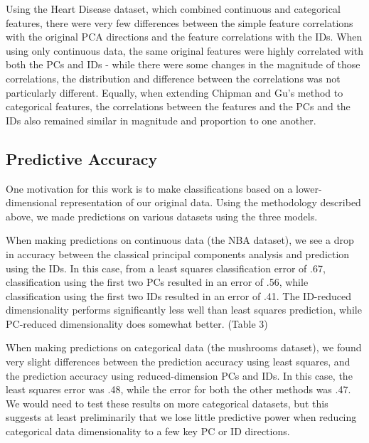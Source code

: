 \documentclass{article}
\begin{document}
{{Using the Heart Disease dataset, which combined continuous and categorical features, there were very few differences between the simple feature correlations with the original PCA directions and the feature correlations with the IDs. When using only continuous data, the same original features were highly correlated with both the PCs and IDs - while there were some changes in the magnitude of those correlations, the distribution and difference between the correlations was not particularly different. Equally, when extending Chipman and Gu’s method to categorical features, the correlations between the features and the PCs and the IDs also remained similar in magnitude and proportion to one another. 
}

\subsection{Predictive Accuracy}{
One motivation for this work is to make classifications based on a lower-dimensional representation of our original data. Using the methodology described above, we made predictions on various datasets using the three models. 

When making predictions on continuous data (the NBA dataset), we see a drop in accuracy between the classical principal components analysis and prediction using the IDs. In this case, from a least squares classification error of .67, classification using the first two PCs resulted in an error of .56, while classification using the first two IDs resulted in an error of .41. The ID-reduced dimensionality performs significantly less well than least squares prediction, while PC-reduced dimensionality does somewhat better. (Table 3)

When making predictions on categorical data (the mushrooms dataset), we found very slight differences between the prediction accuracy using least squares, and the prediction accuracy using reduced-dimension PCs and IDs. In this case, the least squares error was .48, while the error for both the other methods was .47. We would need to test these results on more categorical datasets, but this suggests at least preliminarily that we lose little predictive power when reducing categorical data dimensionality to a few key PC or ID directions. 

}}
\end{document}
